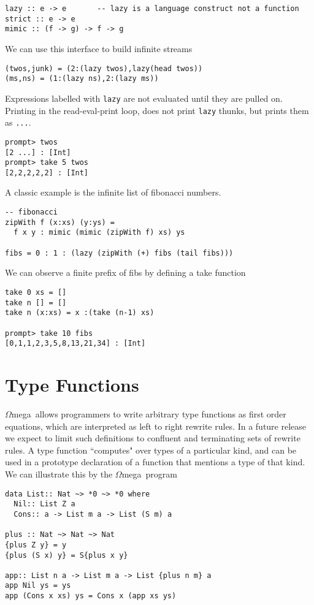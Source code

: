 \documentclass[11pt,twoside]{article}
\newcommand{\om}{$\Omega$mega}
\begin{document}
\begin{verbatim}
lazy :: e -> e       -- lazy is a language construct not a function
strict :: e -> e
mimic :: (f -> g) -> f -> g
\end{verbatim}
We can use this interface to build infinite streams
\begin{verbatim}
(twos,junk) = (2:(lazy twos),lazy(head twos))
(ms,ns) = (1:(lazy ns),2:(lazy ms)) 
\end{verbatim}
Expressions labelled with {\tt lazy} are not evaluated until
they are pulled on. Printing in the read-eval-print loop, does not
print {\tt lazy} thunks, but prints them as {\tt ...}.
\begin{verbatim}
prompt> twos
[2 ...] : [Int]
prompt> take 5 twos
[2,2,2,2,2] : [Int]
\end{verbatim}

A classic example is the infinite list of fibonacci numbers.
\begin{verbatim}
-- fibonacci
zipWith f (x:xs) (y:ys) = 
  f x y : mimic (mimic (zipWith f) xs) ys

fibs = 0 : 1 : (lazy (zipWith (+) fibs (tail fibs)))
\end{verbatim}

We can observe a finite prefix of fibs by defining a take function

\begin{verbatim}
take 0 xs = []
take n [] = []
take n (x:xs) = x :(take (n-1) xs)

prompt> take 10 fibs
[0,1,1,2,3,5,8,13,21,34] : [Int]
\end{verbatim}

\section{Type Functions} \label{typefun}

\om\ allows programmers to write arbitrary type functions 
as first order equations, which are interpreted as left to right
rewrite rules. In a future release we expect
to limit such definitions to confluent
and terminating sets of rewrite rules. A type function ``computes" over
types of a particular kind, and can be used in a prototype declaration
of a function that mentions a type of that kind. We can illustrate this
by the \om\ program
\begin{verbatim}
data List:: Nat ~> *0 ~> *0 where 
  Nil:: List Z a
  Cons:: a -> List m a -> List (S m) a
  
plus :: Nat ~> Nat ~> Nat
{plus Z y} = y
{plus (S x) y} = S{plus x y}
  
app:: List n a -> List m a -> List {plus n m} a   
app Nil ys = ys
app (Cons x xs) ys = Cons x (app xs ys)

\end{verbatim}
\end{document}
